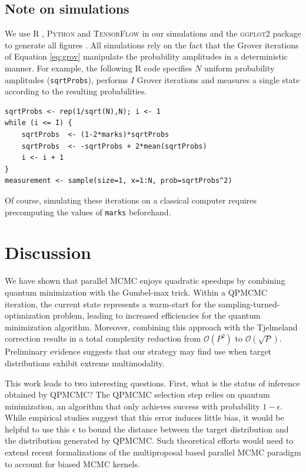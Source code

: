 \documentclass[12pt]{article} %
\begin{document}
\subsection{Note on simulations}

We use \textsc{R} \citep{rlang}, \textsc{Python} \citep{vanrossum1995python} and \textsc{TensorFlow} \citep{abadi2016tensorflow}  in our simulations and the \textsc{ggplot2} package to generate all figures \citep{ggplot}.  All simulations rely on the fact that the Grover iterations of Equation \eqref{eq:grov} manipulate the probability amplitudes in a deterministic manner. For example, the following \textsc{R} code specifies $N$ uniform probability amplitudes (\verb|sqrtProbs|), performs $I$ Grover iterations and measures a single state according to the resulting probabilities.
\begin{verbatim}
sqrtProbs <- rep(1/sqrt(N),N); i <- 1
while (i <= I) {
	sqrtProbs  <- (1-2*marks)*sqrtProbs
	sqrtProbs  <- -sqrtProbs + 2*mean(sqrtProbs)
	i <- i + 1
}
measurement <- sample(size=1, x=1:N, prob=sqrtProbs^2)
\end{verbatim}
Of course, simulating these iterations on a classical computer requires precomputing the values of \verb|marks| beforehand.


\section{Discussion}

We have shown that parallel MCMC enjoys quadratic speedups by combining quantum minimization with the Gumbel-max trick.  Within a QPMCMC iteration, the current state represents a warm-start for the sampling-turned-optimization problem, leading to increased efficiencies for the quantum minimization algorithm.   Moreover, combining this approach with the Tjelmeland correction \citep{holbrook2021generating} results in a total complexity reduction from $\mathcal{O}(P^2)$ to $\mathcal{O}(\sqrt{P})$.  Preliminary evidence suggests that our strategy may find use when target distributions exhibit extreme multimodality.  

This work leads to two interesting questions.   First, what is the status of inference obtained by QPMCMC?  The QPMCMC selection step relies on quantum minimization, an algorithm that only achieves success with probability $1-\epsilon$.  While empirical studies suggest that this error induces little bias, it would be helpful to use this $\epsilon$ to bound the distance between the target distribution and the distribution generated by QPMCMC.  Such theoretical efforts would need to extend recent formalizations of the multiproposal based parallel MCMC paradigm \citep{glatt} to account for biased MCMC kernels.
\end{document}
